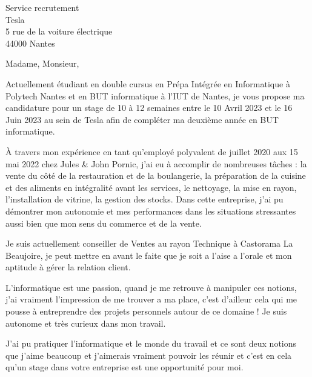 \documentclass[
    french,
    sender,
    paper=a4,
    version=last,
    fontsize=9pt,
    DIV=12,
    BCOR=0mm
]{scrlttr2}
\begin{document}




\begin{letter}{
    Service recrutement\\
    Tesla\\
    5 rue de la voiture électrique\\
    44000 Nantes
}

\opening{Madame, Monsieur,}


Actuellement étudiant en double cursus en Prépa Intégrée en Informatique à Polytech Nantes et en BUT informatique à l’IUT de Nantes, je vous propose ma candidature pour un stage de 10 à 12 semaines entre le 10 Avril 2023 et le 16 Juin 2023 au sein de Tesla afin de compléter ma deuxième année en BUT informatique. 

À travers mon expérience en tant qu’employé polyvalent de juillet 2020 aux 15 mai 2022 chez Jules \& John Pornic, j’ai eu à accomplir de nombreuses tâches : la vente du côté de la restauration et de la boulangerie, la préparation de la cuisine et des aliments en intégralité avant les services, le nettoyage, la mise en rayon, l’installation de vitrine, la gestion des stocks. Dans cette entreprise, j’ai pu démontrer mon autonomie et mes performances dans les situations stressantes aussi bien que mon sens du commerce et de la vente.

Je suis actuellement conseiller de Ventes au rayon Technique à Castorama La Beaujoire, je peut mettre en avant le faite que je soit a l'aise a l'orale et mon aptitude à gérer la relation client.

L’informatique est une passion, quand je me retrouve à manipuler ces notions, j’ai vraiment l'impression de me trouver a ma place, c’est d’ailleur cela qui me pousse à entreprendre des projets personnels autour de ce domaine ! Je suis autonome et très curieux  dans mon travail.

J’ai pu pratiquer l’informatique et le monde du travail et ce sont deux notions que j’aime beaucoup et j’aimerais vraiment pouvoir les réunir et c’est en cela qu’un stage dans votre entreprise est une opportunité pour moi.


\end{letter}
\end{document}
